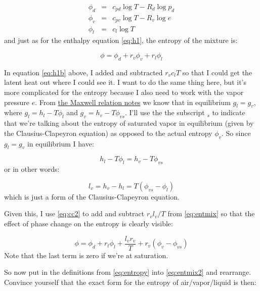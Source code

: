 \documentclass[12pt]{article}
\begin{document}
\begin{subequations}
    \label{eq:entropy}
  \begin{eqnarray}
\phi_d& =& c_{pd} \log T - R_d \log p_d\\
\phi_v &=&c_{pv} \log T - R_v \log e \\
\phi_l &=&c_l \log T
  \end{eqnarray}
\end{subequations}
and just as for the enthalpy equation \eqref{eq:h1}, the entropy of the mixture is:

\begin{equation}
  \label{eq:entmix}
  \phi = \phi_d + r_v \phi_v + r_l \phi_l
\end{equation}

In equation \eqref{eq:h1b} above, I added and subtracted $r_v c_l T$
so that I could get the latent heat out where I could see it.  I want
to do the same thing here, but it's more complicated for the entropy
because I also need to work with the vapor pressure $e$.  From
\href{https://drive.google.com/file/d/1rJO32NGhTW3TA6noQmSdNl2GNXyrZUgA/view}%
{the Maxwell relation notes} we know that in equilibrium $g_l = g_v$, where $g_l= h_l - T\phi_l$
and $g_v= h_v - T \phi_{vs}$.  I'll use the the subscript $_s$ to indicate that we're
talking about the entropy of saturated vapor in equilibrium (given by
the Clausius-Clapeyron equation) as opposed to the actual entropy
$\phi_v$.  So since $g_l=g_v$ in equilibrium I have:

\begin{equation}
  \label{eq:cc}
  h_l  - T\phi_l = h_v  - T \phi_{vs}
\end{equation}
or in other words:

\begin{equation}
  \label{eq:cc2}
 l_v = h_v - h_l = T ( \phi_{vs} - \phi_l)
\end{equation}
which is just a form of the Clausius-Clapeyron equation.

Given this, I use  \eqref{eq:cc2} to add and subtract
$r_v l_v/T$ from \eqref{eq:entmix}
so that the effect of phase change  on the entropy is clearly visible:

\begin{equation}
  \label{eq:entmix2}
  \phi = \phi_d + r_t  \phi_l + \frac{l_v r_v}{T} + r_v( \phi_v - \phi_{vs}) 
\end{equation}
Note that the last term is zero if we're at saturation.


So now put in the definitions from \eqref{eq:entropy} into
\eqref{eq:entmix2} and rearrange.  Convince yourself that the exact
form for the entropy of air/vapor/liquid is then:
\end{document}
